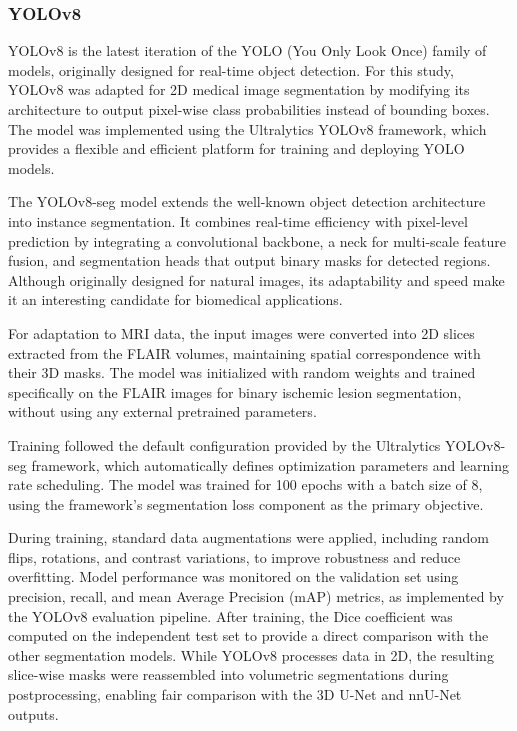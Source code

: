\documentclass[12pt]{article}
\begin{document}
\subsubsection{YOLOv8} \label{subsubsec:yolov8_arch}

YOLOv8 is the latest iteration of the YOLO (You Only Look Once) family of models, originally designed for real-time object detection. For this study, YOLOv8 was adapted for 2D medical image segmentation by modifying its architecture to output pixel-wise class probabilities instead of bounding boxes. The model was implemented using the Ultralytics YOLOv8 framework, which provides a flexible and efficient platform for training and deploying YOLO models.

The YOLOv8-seg model extends the well-known object detection architecture into instance segmentation. It combines real-time efficiency with pixel-level prediction by integrating a convolutional backbone, a neck for multi-scale feature fusion, and segmentation heads that output binary masks for detected regions. Although originally designed for natural images, its adaptability and speed make it an interesting candidate for biomedical applications. 

For adaptation to MRI data, the input images were converted into 2D slices extracted from the FLAIR volumes, maintaining spatial correspondence with their 3D masks. The model was initialized with random weights and trained specifically on the FLAIR images for binary ischemic lesion segmentation, without using any external pretrained parameters.

Training followed the default configuration provided by the Ultralytics YOLOv8-seg framework, which automatically defines optimization parameters and learning rate scheduling. The model was trained for 100 epochs with a batch size of 8, using the framework’s segmentation loss component as the primary objective.

During training, standard data augmentations were applied, including random flips, rotations, and contrast variations, to improve robustness and reduce overfitting.
%
Model performance was monitored on the validation set using precision, recall, and mean Average Precision (mAP) metrics, as implemented by the YOLOv8 evaluation pipeline.
%
After training, the Dice coefficient was computed on the independent test set to provide a direct comparison with the other segmentation models.
%
While YOLOv8 processes data in 2D, the resulting slice-wise masks were reassembled into volumetric segmentations during postprocessing, enabling fair comparison with the 3D U-Net and nnU-Net outputs.
\end{document}
